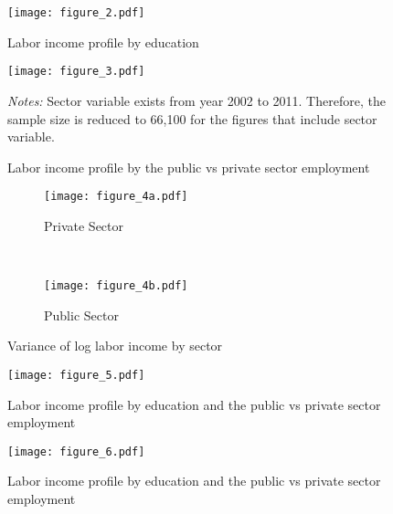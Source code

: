 \documentclass[12pt,author-year]{article}
\begin{document}
\begin{figure}[H]
\label{figure2}
	\centering
	\texttt{[image: figure\_2.pdf]}
	\caption{Labor income profile by education}
\end{figure}

\begin{figure}[H]
\label{figure3}
	\centering
	\texttt{[image: figure\_3.pdf]}   
	\caption{Labor income profile by the public vs private sector employment}
\medskip %
\begin{minipage}{0.75\textwidth} %
	{\footnotesize \textit{Notes:} Sector variable exists from year 2002 to 2011. Therefore, the sample size is reduced to 66,100 for the figures that include sector variable. \par}
\end{minipage}
\end{figure}

\begin{figure}[H]
\label{figure4}
	\centering
	\begin{subfigure}[b]{0.48\textwidth}
		\texttt{[image: figure\_4a.pdf]}
		\caption{Private Sector}
	\end{subfigure}
	~ %
	\begin{subfigure}[b]{0.48\textwidth}
		\texttt{[image: figure\_4b.pdf]}
		\caption{Public Sector}
	\end{subfigure}    
	\caption{Variance of log labor income by sector}
\end{figure}

\begin{figure}[H]
\label{figure5}
	\centering
	\texttt{[image: figure\_5.pdf]} 
	\caption{Labor income profile by education and the public vs private sector employment}
\end{figure}

\begin{figure}[H]
	\label{figure6}
	\centering
	\texttt{[image: figure\_6.pdf]} 
	\caption{Labor income profile by education and the public vs private sector employment}
\end{figure}
\end{document}
